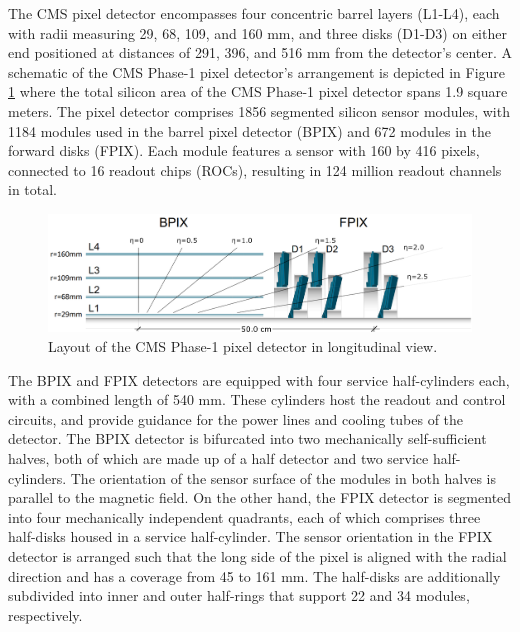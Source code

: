 The CMS pixel detector encompasses four concentric barrel layers (L1-L4), each with radii measuring 29, 68, 109, and 160 mm, and three disks (D1-D3) on either end positioned at distances of 291, 396, and 516 mm from the detector's center. A schematic of the CMS Phase-1 pixel detector's arrangement is depicted in Figure \ref{phase1_pixel_detector} where the total silicon area of the CMS Phase-1 pixel detector spans 1.9 square meters. The pixel detector comprises 1856 segmented silicon sensor modules, with 1184 modules used in the barrel pixel detector (BPIX) and 672 modules in the forward disks (FPIX). Each module features a sensor with 160 by 416 pixels, connected to 16 readout chips (ROCs), resulting in 124 million readout channels in total.

\begin{center}
  \begin{figure}[h]
    \centering
    \includegraphics[scale=.26]{Chapter2/phase1_PixelDetector.png}
    \caption[CMS Phase-1 pixel detector]{Layout of the CMS Phase-1 pixel detector in longitudinal view\cite{phase1_Pixel_Detector}.}
    \label{phase1_pixel_detector}
  \end{figure}
\end{center}

The BPIX and FPIX detectors are equipped with four service half-cylinders each, with a combined length of 540 mm. These cylinders host the readout and control circuits, and provide guidance for the power lines and cooling tubes of the detector. The BPIX detector is bifurcated into two mechanically self-sufficient halves, both of which are made up of a half detector and two service half-cylinders. The orientation of the sensor surface of the modules in both halves is parallel to the magnetic field.
On the other hand, the FPIX detector is segmented into four mechanically independent quadrants, each of which comprises three half-disks housed in a service half-cylinder. The sensor orientation in the FPIX detector is arranged such that the long side of the pixel is aligned with the radial direction and has a coverage from 45 to 161 mm. The half-disks are additionally subdivided into inner and outer half-rings that support 22 and 34 modules, respectively.\\


